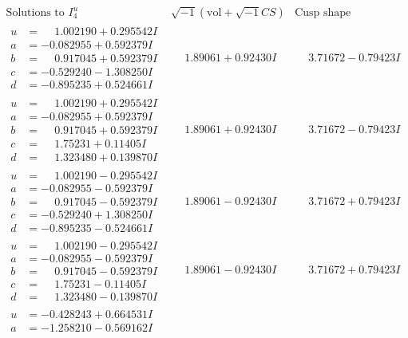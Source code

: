 \documentclass[1p]{elsarticle_modified}
\theoremstyle{definition}
\newcommand{\I}{\sqrt{-1}}
\begin{document}
$$\begin{array}{c|c|c}  
\text{Solutions to }I^u_{4}& \I (\text{vol} + \sqrt{-1}CS) & \text{Cusp shape}\\
 \hline 
\begin{aligned}
u &= \phantom{-}1.002190 + 0.295542 I \\
a &= -0.082955 + 0.592379 I \\
b &= \phantom{-}0.917045 + 0.592379 I \\
c &= -0.529240 - 1.308250 I \\
d &= -0.895235 + 0.524661 I\end{aligned}
 & \phantom{-}1.89061 + 0.92430 I & \phantom{-}3.71672 - 0.79423 I \\ \hline\begin{aligned}
u &= \phantom{-}1.002190 + 0.295542 I \\
a &= -0.082955 + 0.592379 I \\
b &= \phantom{-}0.917045 + 0.592379 I \\
c &= \phantom{-}1.75231 + 0.11405 I \\
d &= \phantom{-}1.323480 + 0.139870 I\end{aligned}
 & \phantom{-}1.89061 + 0.92430 I & \phantom{-}3.71672 - 0.79423 I \\ \hline\begin{aligned}
u &= \phantom{-}1.002190 - 0.295542 I \\
a &= -0.082955 - 0.592379 I \\
b &= \phantom{-}0.917045 - 0.592379 I \\
c &= -0.529240 + 1.308250 I \\
d &= -0.895235 - 0.524661 I\end{aligned}
 & \phantom{-}1.89061 - 0.92430 I & \phantom{-}3.71672 + 0.79423 I \\ \hline\begin{aligned}
u &= \phantom{-}1.002190 - 0.295542 I \\
a &= -0.082955 - 0.592379 I \\
b &= \phantom{-}0.917045 - 0.592379 I \\
c &= \phantom{-}1.75231 - 0.11405 I \\
d &= \phantom{-}1.323480 - 0.139870 I\end{aligned}
 & \phantom{-}1.89061 - 0.92430 I & \phantom{-}3.71672 + 0.79423 I \\ \hline\begin{aligned}
u &= -0.428243 + 0.664531 I \\
a &= -1.258210 - 0.569162 I \\

\end{aligned}
\end{array}$$
\end{document}
